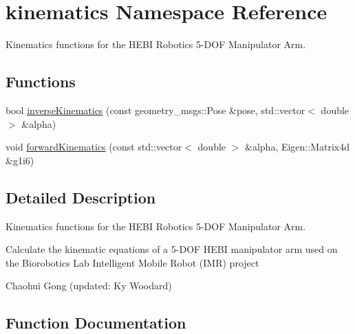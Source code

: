 \hypertarget{namespacekinematics}{}\section{kinematics Namespace Reference}
\label{namespacekinematics}


Kinematics functions for the H\+E\+BI Robotics 5-\/\+D\+OF Manipulator Arm.  


\subsection*{Functions}
\begin{DoxyCompactItemize}
\item 
bool \hyperlink{namespacekinematics_a5a3e9ea9b4ee18137b3c909038cf57c3}{inverse\+Kinematics} (const geometry\+\_\+msgs\+::\+Pose \&pose, std\+::vector$<$ double $>$ \&alpha)
\item 
void \hyperlink{namespacekinematics_a86c140821059c3c30f2b8051f381cdd3}{forward\+Kinematics} (const std\+::vector$<$ double $>$ \&alpha, Eigen\+::\+Matrix4d \&g1i6)
\end{DoxyCompactItemize}


\subsection{Detailed Description}
Kinematics functions for the H\+E\+BI Robotics 5-\/\+D\+OF Manipulator Arm. 

Calculate the kinematic equations of a 5-\/\+D\+OF H\+E\+BI manipulator arm used on the Biorobotics Lab Intelligent Mobile Robot (I\+MR) project

Chaohui Gong (updated\+: Ky Woodard) 

\subsection{Function Documentation}
